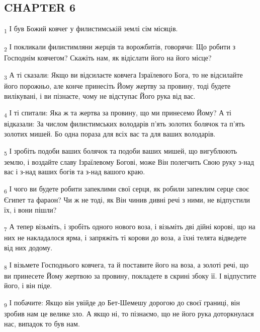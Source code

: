 \subsection{CHAPTER 6}
\begin{tcolorbox}
\textsubscript{1} І був Божий ковчег у филистимській землі сім місяців.
\end{tcolorbox}
\begin{tcolorbox}
\textsubscript{2} І покликали филистимляни жерців та ворожбитів, говорячи: Що робити з Господнім ковчегом? Скажіть нам, як відіслати його на його місце?
\end{tcolorbox}
\begin{tcolorbox}
\textsubscript{3} А ті сказали: Якщо ви відсилаєте ковчега Ізраїлевого Бога, то не відсилайте його порожньо, але конче принесіть Йому жертву за провину, тоді будете вилікувані, і ви пізнаєте, чому не відступає Його рука від вас.
\end{tcolorbox}
\begin{tcolorbox}
\textsubscript{4} І ті спитали: Яка ж та жертва за провину, що ми принесемо Йому? А ті відказали: За числом филистимських володарів п'ять золотих болячок та п'ять золотих мишей. Бо одна пораза для всіх вас та для ваших володарів.
\end{tcolorbox}
\begin{tcolorbox}
\textsubscript{5} І зробіть подоби ваших болячок та подоби ваших мишей, що вигублюють землю, і воздайте славу Ізраїлевому Богові, може Він полегчить Свою руку з-над вас і з-над ваших богів та з-над вашого краю.
\end{tcolorbox}
\begin{tcolorbox}
\textsubscript{6} І чого ви будете робити запеклими свої серця, як робили запеклим серце своє Єгипет та фараон? Чи ж не тоді, як Він чинив дивні речі з ними, не відпустили їх, і вони пішли?
\end{tcolorbox}
\begin{tcolorbox}
\textsubscript{7} А тепер візьміть, і зробіть одного нового воза, і візьміть дві дійні корові, що на них не накладалося ярма, і запряжіть ті корови до воза, а їхні телята відведете від них додому.
\end{tcolorbox}
\begin{tcolorbox}
\textsubscript{8} І візьмете Господнього ковчега, та й поставите його на воза, а золоті речі, що ви принесете Йому жертвою за провину, покладете в скрині збоку її. І відпустите його, і він піде.
\end{tcolorbox}
\begin{tcolorbox}
\textsubscript{9} І побачите: Якщо він увійде до Бет-Шемешу дорогою до своєї границі, він зробив нам це велике зло. А якщо ні, то пізнаємо, що не його рука доторкнулася нас, випадок то був нам.
\end{tcolorbox}
